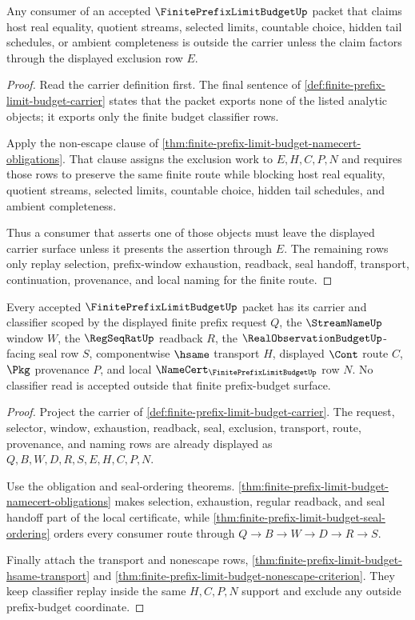 \begin{theorem}
\label{thm:finite-prefix-limit-budget-nonescape-criterion}
Any consumer of an accepted $\FinitePrefixLimitBudgetUp$ packet that claims host real equality, quotient streams, selected limits, countable choice, hidden tail schedules, or ambient completeness is outside the carrier unless the claim factors through the displayed exclusion row $E$.
\end{theorem}
\begin{proof}
Read the carrier definition first. The final sentence of \autoref{def:finite-prefix-limit-budget-carrier} states that the packet exports none of the listed analytic objects; it exports only the finite budget classifier rows.

Apply the non-escape clause of \autoref{thm:finite-prefix-limit-budget-namecert-obligations}. That clause assigns the exclusion work to $E,H,C,P,N$ and requires those rows to preserve the same finite route while blocking host real equality, quotient streams, selected limits, countable choice, hidden tail schedules, and ambient completeness.

Thus a consumer that asserts one of those objects must leave the displayed carrier surface unless it presents the assertion through $E$. The remaining rows only replay selection, prefix-window exhaustion, readback, seal handoff, transport, continuation, provenance, and local naming for the finite route.
\end{proof}

\begin{theorem}
\label{thm:finite-prefix-limit-budget-carrier-classifier-scope}
Every accepted $\FinitePrefixLimitBudgetUp$ packet has its carrier and classifier scoped by the displayed finite prefix request $Q$, the $\StreamNameUp$ window $W$, the $\RegSeqRatUp$ readback $R$, the $\RealObservationBudgetUp$-facing seal row $S$, componentwise $\hsame$ transport $H$, displayed $\Cont$ route $C$, $\Pkg$ provenance $P$, and local $\NameCert_{\FinitePrefixLimitBudgetUp}$ row $N$. No classifier read is accepted outside that finite prefix-budget surface.
\end{theorem}
\begin{proof}
Project the carrier of \autoref{def:finite-prefix-limit-budget-carrier}. The request, selector, window, exhaustion, readback, seal, exclusion, transport, route, provenance, and naming rows are already displayed as $Q,B,W,D,R,S,E,H,C,P,N$.

Use the obligation and seal-ordering theorems. \autoref{thm:finite-prefix-limit-budget-namecert-obligations} makes selection, exhaustion, regular readback, and seal handoff part of the local certificate, while \autoref{thm:finite-prefix-limit-budget-seal-ordering} orders every consumer route through $Q \to B \to W \to D \to R \to S$.

Finally attach the transport and nonescape rows, \autoref{thm:finite-prefix-limit-budget-hsame-transport} and \autoref{thm:finite-prefix-limit-budget-nonescape-criterion}. They keep classifier replay inside the same $H,C,P,N$ support and exclude any outside prefix-budget coordinate.
\end{proof}

